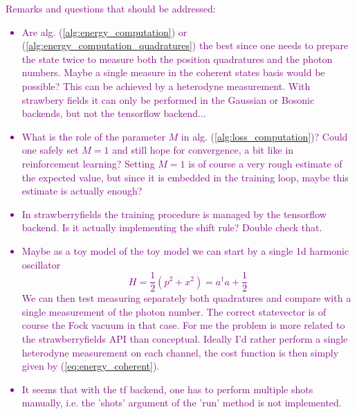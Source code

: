 \documentclass[reprint, amsmath, amssymb, aps]{revtex4-2}
\begin{document}
\textcolor{purple}{
    Remarks and questions that should be addressed:
    \begin{itemize}
        \item Are alg. (\ref{alg:energy_computation}) or (\ref{alg:energy_computation_quadratures}) the best since one needs to prepare the state twice to measure both the position quadratures and the photon numbers. Maybe a single measure in the coherent states basis would be possible? This can be achieved by a heterodyne measurement. With strawbery fields it can only be performed in the Gaussian or Bosonic backends, but not the tensorflow backend...
        \item What is the role of the parameter $M$ in alg. (\ref{alg:loss_computation})? Could one safely set $M=1$ and still hope for convergence, a bit like in reinforcement learning? Setting $M=1$ is of course a very rough estimate of the expected value, but since it is embedded in the training loop, maybe this estimate is actually enough?
        \item In strawberryfields the training procedure is managed by the tensorflow backend. Is it actually implementing the shift rule? Double check that.
        \item Maybe as a toy model of the toy model we can start by a single 1d harmonic oscillator
        \begin{equation}
            H = \frac{1}{2}\left(p^2+x^2\right) = a^\dagger a+\frac{1}{2}
        \end{equation}
        We can then test measuring separately both quadratures and compare with a single measurement of the photon number. The correct statevector is of course the Fock vacuum in that case. For me the problem is more related to the strawberryfields API than conceptual. Ideally I'd rather perform a single heterodyne measurement on each channel, the cost function is then simply given by (\ref{eq:energy_coherent}).
        \item It seems that with the tf backend, one has to perform multiple shots manually, i.e. the 'shots' argument of the 'run' method is not implemented.

\end{itemize}}
\end{document}

